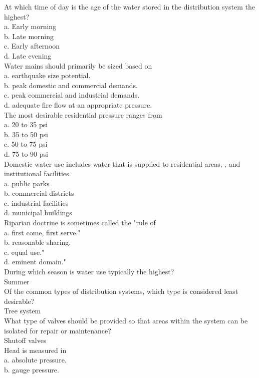 At which time of day is the age of the water stored in the distribution system the highest?\\
a.	Early morning\\
b.	Late morning\\
c.	Early afternoon\\
d.	Late evening\\
Water mains should primarily be sized based on\\
a.	earthquake size potential.\\
b.	peak domestic and commercial demands.\\
c.	peak commercial and industrial demands.\\
d.	adequate fire flow at an appropriate pressure.\\
The most desirable residential pressure ranges from\\
a.	20 to 35 psi\\
b.	35 to 50 psi \\
c.	50 to 75 psi\\
d.	75 to 90 psi \\
Domestic water use includes water that is supplied to residential areas,	, and institutional facilities.\\
a.	public parks\\
b.	commercial districts\\
c.	industrial facilities\\
d.	municipal buildings\\
Riparian doctrine is sometimes called the "rule of\\
a.	first come, first serve."\\
b.	reasonable sharing.\\
c.	equal use."\\
d.	eminent domain."\\
During which season is water use typically the highest?\\
Summer\\
Of the common types of distribution systems, which type is considered least desirable?\\
Tree system\\
What type of valves should be provided so that areas within the system can be isolated for repair or maintenance?\\
Shutoff valves\\
Head is measured in\\
a.	absolute pressure.\\
b.	gauge pressure.\\
